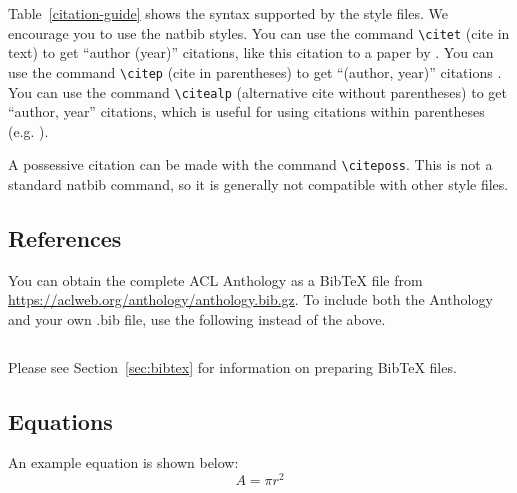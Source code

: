 \documentclass[11pt]{article}
\begin{document}
Table~\ref{citation-guide} shows the syntax supported by the style files.
We encourage you to use the natbib styles.
You can use the command \verb|\citet| (cite in text) to get ``author (year)'' citations, like this citation to a paper by \citet{Gusfield:97}.
You can use the command \verb|\citep| (cite in parentheses) to get ``(author, year)'' citations \citep{Gusfield:97}.
You can use the command \verb|\citealp| (alternative cite without parentheses) to get ``author, year'' citations, which is useful for using citations within parentheses (e.g. \citealp{Gusfield:97}).

A possessive citation can be made with the command \verb|\citeposs|.
This is not a standard natbib command, so it is generally not compatible
with other style files.

\subsection{References}

\nocite{Ando2005,andrew2007scalable,rasooli-tetrault-2015}

% 

You can obtain the complete ACL Anthology as a Bib\TeX{} file from \url{https://aclweb.org/anthology/anthology.bib.gz}.
To include both the Anthology and your own .bib file, use the following instead of the above.
\begin{quote}
\begin{verbatim}

\end{verbatim}
\end{quote}

Please see Section~\ref{sec:bibtex} for information on preparing Bib\TeX{} files.

\subsection{Equations}

An example equation is shown below:
\begin{equation}
  \label{eq:example}
  A = \pi r^2
\end{equation}
\end{document}
